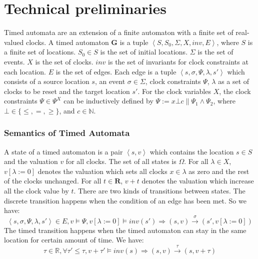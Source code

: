 \section{Technical preliminaries}
\label{preliminaries}
Timed automata \cite{timed_automata} are an extension of a finite automaton with a finite set of real-valued clocks. 
A timed automaton \textbf{G} is a tuple $\left\langle S,S_0,\Sigma,X,inv,E\right\rangle$, where
 $S$ is a finite set of locations.
 $S_0\in S$ is the set of initial locations.
 $\Sigma$ is the set of events.
$X$ is the set of clocks.
$inv$ is the set of invariants for clock constraints at each location.
 $E$ is the set of edges. Each edge is a tuple $\left\langle s,\sigma,\Psi,\lambda,s'\right\rangle$ which consists of a source location $s$, an event $\sigma\in\Sigma$, clock constraints $\Psi$, $\lambda$ as a set of clocks to be reset and the target location $s'$. For the clock variables $X$, the clock constraints $\Psi\in\Psi^X$ can be inductively defined by $\Psi:=x\bot c\|\Psi_1\wedge\Psi_2$, where $\bot\in\{\leq,=,\geq\}$, and $c\in\mathbb{N}$.
\vspace{-10pt}
\subsubsection{Semantics of Timed Automata}
A state of a timed automaton is a pair $\left\langle s,v\right\rangle$ which contains the location $s\in S$ and the valuation $v$ for all clocks. The set of all states is $\Omega$. 
For all $\lambda\in X$, $v[\lambda :=0]$ denotes the valuation which sets all clocks $x\in\lambda$ as zero and the rest of the clocks unchanged. For all $t\in \textbf{R}$, $v+t$ denotes the valuation which increase all the clock value by $t$. There are two kinds of transitions between states. The \textsf{discrete transition} happens when the condition of an edge has been met. So we have:
$$\left\langle s,\sigma,\Psi,\lambda,s'\right\rangle\in E,v\models \Psi,v[\lambda :=0]\models inv(s')\Rightarrow (s,v)\xrightarrow{\sigma}(s',v[\lambda :=0])$$
The \textsf{timed transition} happens when the timed automaton can stay in the same location for certain amount of time. We have:
$$\tau\in \mathbb{R},\forall \tau'\leq\tau, v+\tau'\models inv(s)\Rightarrow (s,v)\xrightarrow{\tau}(s,v+\tau)$$
\vspace{-15pt}
